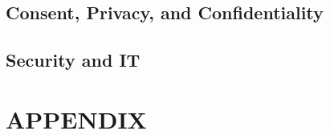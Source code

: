 \documentclass[12pt,titlepage]{article}
\begin{document}



\subsection{Consent, Privacy, and Confidentiality}
\label{sec:consent}


\subsection{Security and IT}
\label{sec:security}


	\singlespacing
	 \nocite{*}
	
	

\clearpage
\appendix
\section*{APPENDIX}
\setcounter{section}{1}
\label{sec:appendix}

\end{document}
